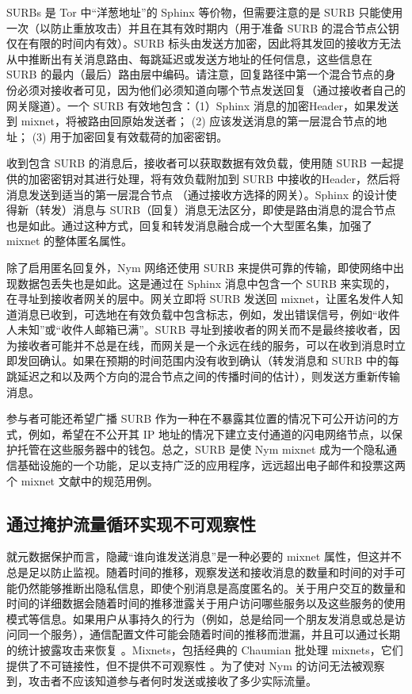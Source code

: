 \documentclass{article}
\begin{document}
	SURBs 是 Tor 中“洋葱地址”的 Sphinx 等价物，但需要注意的是 SURB 只能使用一次（以防止重放攻击）并且在其有效时期内（用于准备 SURB 的混合节点公钥仅在有限的时间内有效）。SURB 标头由发送方加密，因此将其发回的接收方无法从中推断出有关消息路由、每跳延迟或发送方地址的任何信息，这些信息在 SURB 的最内（最后）路由层中编码。请注意，回复路径中第一个混合节点的身份必须对接收者可见，因为他们必须知道向哪个节点发送回复（通过接收者自己的网关隧道）。一个 SURB 有效地包含：（1）Sphinx 消息的加密Header，如果发送到 mixnet，将被路由回原始发送者； (2) 应该发送消息的第一层混合节点的地址； (3) 用于加密回复有效载荷的加密密钥。\newline

	收到包含 SURB 的消息后，接收者可以获取数据有效负载，使用随 SURB 一起提供的加密密钥对其进行处理，将有效负载附加到 SURB 中接收的Header，然后将消息发送到适当的第一层混合节点 （通过接收方选择的网关）。Sphinx 的设计使得新（转发）消息与 SURB（回复）消息无法区分，即使是路由消息的混合节点也是如此。通过这种方式，回复和转发消息融合成一个大型匿名集，加强了 mixnet 的整体匿名属性。\newline

	除了启用匿名回复外，Nym 网络还使用 SURB 来提供可靠的传输，即使网络中出现数据包丢失也是如此。这是通过在 Sphinx 消息中包含一个 SURB 来实现的，在寻址到接收者网关的层中。网关立即将 SURB 发送回 mixnet，让匿名发件人知道消息已收到，可选地在有效负载中包含标志，例如，发出错误信号，例如“收件人未知”或“收件人邮箱已满”。SURB 寻址到接收者的网关而不是最终接收者，因为接收者可能并不总是在线，而网关是一个永远在线的服务，可以在收到消息时立即发回确认。如果在预期的时间范围内没有收到确认（转发消息和 SURB 中的每跳延迟之和以及两个方向的混合节点之间的传播时间的估计），则发送方重新传输消息。\newline

	参与者可能还希望广播 SURB 作为一种在不暴露其位置的情况下可公开访问的方式，例如，希望在不公开其 IP 地址的情况下建立支付通道的闪电网络节点，以保护托管在这些服务器中的钱包。总之，SURB 是使 Nym mixnet 成为一个隐私通信基础设施的一个功能，足以支持广泛的应用程序，远远超出电子邮件和投票这两个 mixnet 文献中的规范用例。\newline

	\subsection{通过掩护流量循环实现不可观察性}

	就元数据保护而言，隐藏“谁向谁发送消息”是一种必要的 mixnet 属性，但这并不总是足以防止监视。随着时间的推移，观察发送和接收消息的数量和时间的对手可能仍然能够推断出隐私信息，即使个别消息是高度匿名的\cite{ref32}。关于用户交互的数量和时间的详细数据会随着时间的推移泄露关于用户访问哪些服务以及这些服务的使用模式等信息。如果用户从事持久的行为（例如，总是给同一个朋友发消息或总是访问同一个服务），通信配置文件可能会随着时间的推移而泄漏，并且可以通过长期的统计披露攻击来恢复 \cite{ref26, ref31}。Mixnets，包括经典的 Chaumian 批处理 mixnets，它们提供了不可链接性，但不提供不可观察性 \cite{ref87}。为了使对 Nym 的访问无法被观察到，攻击者不应该知道参与者何时发送或接收了多少实际流量。\newline
\end{document}
